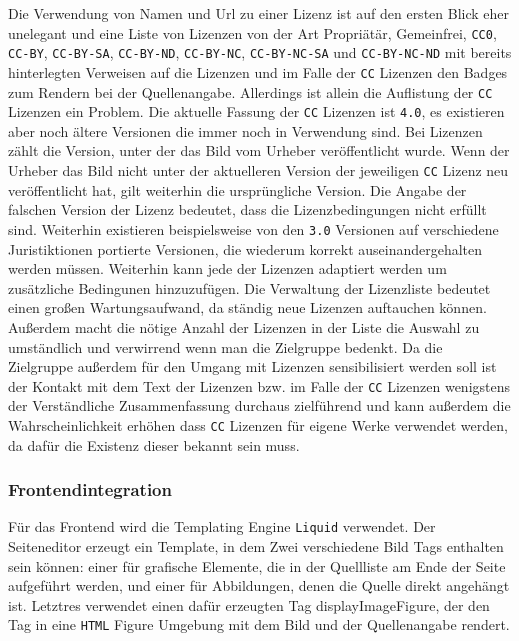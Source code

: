Die Verwendung von Namen und Url zu einer Lizenz ist auf den ersten Blick eher
unelegant und eine Liste von Lizenzen von der Art Propriätär, Gemeinfrei,
\texttt{CC0}, \texttt{CC-BY}, \texttt{CC-BY-SA}, \texttt{CC-BY-ND},
\texttt{CC-BY-NC}, \texttt{CC-BY-NC-SA} und \texttt{CC-BY-NC-ND} mit bereits
hinterlegten Verweisen auf die Lizenzen und im Falle der \texttt{CC} Lizenzen
den Badges zum Rendern bei der Quellenangabe. Allerdings ist allein die
Auflistung der \texttt{CC} Lizenzen ein Problem. Die aktuelle Fassung der
\texttt{CC} Lizenzen ist \texttt{4.0}, es existieren aber noch ältere Versionen
die immer noch in Verwendung sind. Bei Lizenzen zählt die Version, unter der das
Bild vom Urheber veröffentlicht wurde. Wenn der Urheber das Bild nicht unter der
aktuelleren Version der jeweiligen \texttt{CC} Lizenz neu veröffentlicht hat,
gilt weiterhin die ursprüngliche Version. Die Angabe der falschen Version der
Lizenz bedeutet, dass die Lizenzbedingungen nicht erfüllt sind. Weiterhin
existieren beispielsweise von den \texttt{3.0} Versionen auf verschiedene
Juristiktionen portierte Versionen, die wiederum korrekt auseinandergehalten
werden müssen. Weiterhin kann jede der Lizenzen adaptiert werden um zusätzliche
Bedingunen hinzuzufügen. Die Verwaltung der Lizenzliste bedeutet einen großen
Wartungsaufwand, da ständig neue Lizenzen auftauchen können. Außerdem macht die
nötige Anzahl der Lizenzen in der Liste die Auswahl zu umständlich und
verwirrend wenn man die Zielgruppe bedenkt. Da die Zielgruppe außerdem für den
Umgang mit Lizenzen sensibilisiert werden soll ist der Kontakt mit dem Text der
Lizenzen bzw. im Falle der \texttt{CC} Lizenzen wenigstens der Verständliche
Zusammenfassung durchaus zielführend und kann außerdem die Wahrscheinlichkeit
erhöhen dass \texttt{CC} Lizenzen für eigene Werke verwendet werden, da dafür
die Existenz dieser bekannt sein muss.

\subsubsection{Frontendintegration}

Für das Frontend wird die Templating Engine \texttt{Liquid} verwendet. Der
Seiteneditor erzeugt ein Template, in dem Zwei verschiedene Bild Tags enthalten
sein können: einer für grafische Elemente, die in der Quellliste am Ende der
Seite aufgeführt werden, und einer für Abbildungen, denen die Quelle direkt
angehängt ist. Letztres verwendet einen dafür erzeugten Tag displayImageFigure,
der den Tag in eine \texttt{HTML} Figure Umgebung mit dem Bild und der
Quellenangabe rendert.

